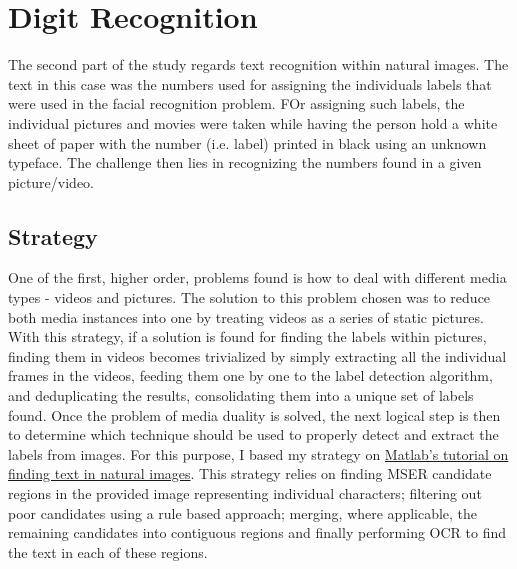 \documentclass[11pt]{article}
\begin{document}
\section{Digit Recognition}\label{sec:digit_ocr}

The second part of the study regards text recognition within natural images. The text in this case was the numbers used for assigning the individuals labels that were used in the facial recognition problem. FOr assigning such labels, the individual pictures and movies were taken while having the person hold a white sheet of paper with the number (i.e. label) printed in black using an unknown typeface. The challenge then lies in recognizing the numbers found in a given picture/video.

\subsection{Strategy}
    One of the first, higher order, problems found is how to deal with different media types - videos and pictures. The solution to this problem chosen was to reduce both media instances into one by treating videos as a series of static pictures. With this strategy, if a solution is found for finding the labels within pictures, finding them in videos becomes trivialized by simply extracting all the individual frames in the videos, feeding them one by one to the label detection algorithm, and deduplicating the results, consolidating them into a unique set of labels found.
    Once the problem of media duality is solved, the next logical step is then to determine which technique should be used to properly detect and extract the labels from images. For this purpose, I based my strategy on \href{https://uk.mathworks.com/help/vision/examples/automatically-detect-and-recognize-text-in-natural-images.html}{Matlab's tutorial on finding text in natural images}. This strategy relies on finding MSER candidate regions in the provided image representing individual characters; filtering out poor candidates using a rule based approach; merging, where applicable, the remaining candidates into contiguous regions and finally performing OCR to find the text in each of these regions.
\end{document}
